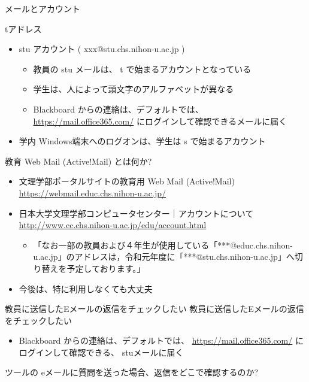 \documentclass[a4j,10pt]{jsarticle}
\begin{document}
{\begin{frame}[label={sec:orgf27b200},fragile]{メールとアカウント}
\begin{block}{tアドレス}
\begin{itemize}
\item stu アカウント ( xxx@stu.chs.nihon-u.ac.jp )
\begin{itemize}
\item 教員の stu メールは、 t で始まるアカウントとなっている
\item 学生は、人によって頭文字のアルファベットが異なる
\item Blackboard からの連絡は、デフォルトでは、
\url{https://mail.office365.com/}
にログインして確認できるメールに届く
\end{itemize}
\item 学内 Windows端末へのログオンは、学生は s で始まるアカウント
\end{itemize}
\end{block}
\par
\begin{block}{教育 Web Mail (Active!Mail) とは何か?}
\begin{itemize}
\item 文理学部ポータルサイトの教育用 Web Mail (Active!Mail)
\url{https://webmail.educ.chs.nihon-u.ac.jp/}
\par
\item 日本大学文理学部コンピュータセンター｜アカウントについて
\url{http://www.cc.chs.nihon-u.ac.jp/edu/account.html}
\begin{itemize}
\item 「なお一部の教員および４年生が使用している「***@educ.chs.nihon-u.ac.jp」のアドレスは，令和元年度に「***@stu.chs.nihon-u.ac.jp」へ切り替えを予定しております。」
\end{itemize}
\par
\item 今後は、特に利用しなくても大丈夫
\end{itemize}
\end{block}
\par
\begin{block}{教員に送信したEメールの返信をチェックしたい}
教員に送信したEメールの返信をチェックしたい
\par
\begin{itemize}
\item Blackboard からの連絡は、デフォルトでは、
\url{https://mail.office365.com/}
にログインして確認できる、 stuメールに届く
\end{itemize}
\end{block}
\par
\begin{block}{ツールの eメールに質問を送った場合、返信をどこで確認するのか?}
\begin{itemize}

\end{itemize}
\end{block}
\end{frame}}
\end{document}
